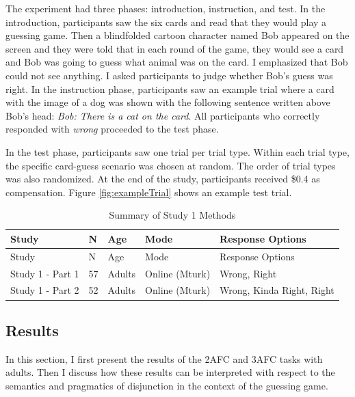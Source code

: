 \documentclass[oneside]{report}
\theoremstyle{definition}
\theoremstyle{definition}
\theoremstyle{definition}
\theoremstyle{remark}
\begin{document}
The experiment had three phases: introduction, instruction, and test. In
the introduction, participants saw the six cards and read that they
would play a guessing game. Then a blindfolded cartoon character named
Bob appeared on the screen and they were told that in each round of the
game, they would see a card and Bob was going to guess what animal was
on the card. I emphasized that Bob could not see anything. I asked
participants to judge whether Bob's guess was right. In the instruction
phase, participants saw an example trial where a card with the image of
a dog was shown with the following sentence written above Bob's head:
\emph{Bob: There is a cat on the card}. All participants who correctly
responded with \emph{wrong} proceeded to the test phase.

In the test phase, participants saw one trial per trial type. Within
each trial type, the specific card-guess scenario was chosen at random.
The order of trial types was also randomized. At the end of the study,
participants received \$0.4 as compensation. Figure
\ref{fig:exampleTrial} shows an example test trial.
\begin{longtable}[]{@{}lllll@{}}
\caption{\label{tab:study1info} Summary of Study 1 Methods}\tabularnewline
\toprule
Study & N & Age & Mode & Response Options\tabularnewline
\midrule
\endfirsthead
\toprule
Study & N & Age & Mode & Response Options\tabularnewline
\midrule
\endhead
Study 1 - Part 1 & 57 & Adults & Online (Mturk) & Wrong,
Right\tabularnewline
Study 1 - Part 2 & 52 & Adults & Online (Mturk) & Wrong, Kinda Right,
Right\tabularnewline
\bottomrule
\end{longtable}
\subsection{Results}\label{results}

In this section, I first present the results of the 2AFC and 3AFC tasks
with adults. Then I discuss how these results can be interpreted with
respect to the semantics and pragmatics of disjunction in the context of
the guessing game.
\end{document}

